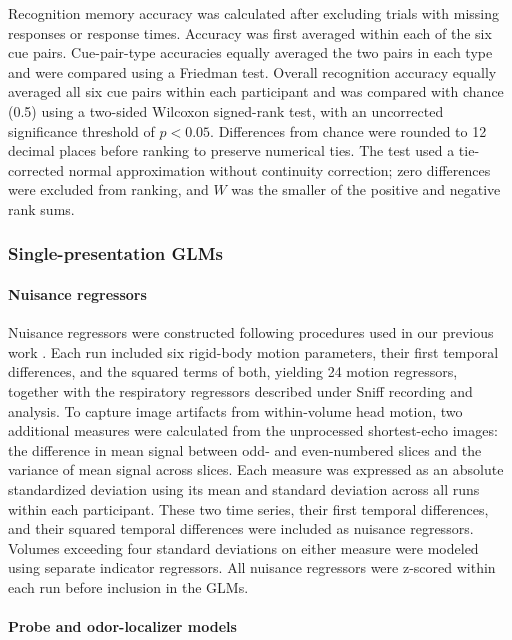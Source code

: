 \documentclass[12pt,letterpaper]{article}
\begin{document}
Recognition memory accuracy was calculated after excluding trials with missing responses or response times. Accuracy was first averaged within each of the six cue pairs. Cue-pair-type accuracies equally averaged the two pairs in each type and were compared using a Friedman test. Overall recognition accuracy equally averaged all six cue pairs within each participant and was compared with chance (0.5) using a two-sided Wilcoxon signed-rank test, with an uncorrected significance threshold of $p < 0.05$. Differences from chance were rounded to 12 decimal places before ranking to preserve numerical ties. The test used a tie-corrected normal approximation without continuity correction; zero differences were excluded from ranking, and $W$ was the smaller of the positive and negative rank sums.

\subsubsection*{Single-presentation GLMs}

\paragraph*{Nuisance regressors}

Nuisance regressors were constructed following procedures used in our previous work \citep{liu2025distinct,liuyaoatt24}. Each run included six rigid-body motion parameters, their first temporal differences, and the squared terms of both, yielding 24 motion regressors, together with the respiratory regressors described under Sniff recording and analysis. To capture image artifacts from within-volume head motion, two additional measures were calculated from the unprocessed shortest-echo images: the difference in mean signal between odd- and even-numbered slices and the variance of mean signal across slices. Each measure was expressed as an absolute standardized deviation using its mean and standard deviation across all runs within each participant. These two time series, their first temporal differences, and their squared temporal differences were included as nuisance regressors. Volumes exceeding four standard deviations on either measure were modeled using separate indicator regressors. All nuisance regressors were z-scored within each run before inclusion in the GLMs.

\paragraph*{Probe and odor-localizer models}
\end{document}
